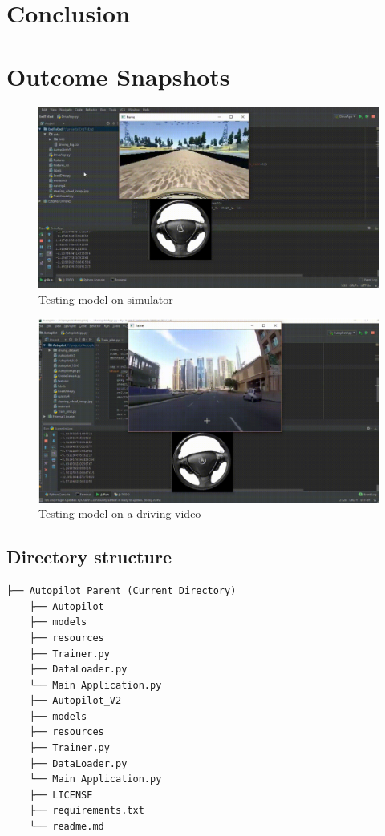 \documentclass[11pt]{article}
\begin{document}
\section{Conclusion}
\label{sec:orgc73452d}
\clearpage
\section{Outcome Snapshots}
\label{sec:org5753b43}
\begin{figure}[htbp]
\centering
\includegraphics[width=.9\linewidth]{./img/project-running.png}
\caption{\label{fig:orga7b5b99}Testing model on simulator}
\end{figure}

\begin{figure}[htbp]
\centering
\includegraphics[width=.9\linewidth]{./img/project-running2.png}
\caption{\label{fig:orgfb4327a}Testing model on a driving video}
\end{figure}

\subsection{Directory structure}
\label{sec:orgca7652e}
\begin{verbatim}
├── Autopilot Parent (Current Directory)
    ├── Autopilot
	├── models 
	├── resources
	├── Trainer.py
	├── DataLoader.py
	└── Main Application.py
    ├── Autopilot_V2
	├── models 
	├── resources
	├── Trainer.py
	├── DataLoader.py
	└── Main Application.py
    ├── LICENSE
    ├── requirements.txt
    └── readme.md
\end{verbatim}
\end{document}
